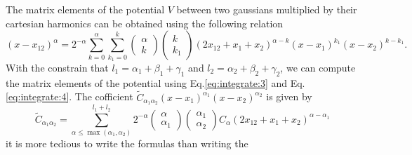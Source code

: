 \documentclass[prb]{revtex4}
\begin{document}
The matrix elements of the potential $V$ between two gaussians multiplied by
their cartesian harmonics can be obtained using the following relation
\begin{equation}
  \label{eq:integrate:6}
  (x-x_{12})^\alpha = 2 ^{-\alpha}\sum_{k=0}^\alpha\sum_{k_1=0}^k\left(
  \begin{array}{c}
    \alpha \\
    k
  \end{array}
  \right)
  \left(
  \begin{array}{c}
    k \\
    k_1
  \end{array}
  \right)
  (2 x_{12} + x_1 + x_2)^{\alpha-k}(x-x_1)^{k_1}(x-x_2)^{k-k_1}.
\end{equation}
With the constrain that $l_1 =\alpha_1+\beta_1+\gamma_1$ and $l_2
=\alpha_2+\beta_2+\gamma_2$, we can compute the matrix elements of the potential
using Eq.\ref{eq:integrate:3} and Eq.\ref{eq:integrate:4}. The cofficient
${\tilde C}_{\alpha_1\alpha_2} (x-x_1)^{\alpha_1} (x-x_2)^{\alpha_2}$ is given
by
\begin{equation}
  {\tilde C}_{\alpha_1\alpha_2}=\sum_{\alpha \leq \max(\alpha_1,\alpha_2)}^{l_1+l_2}2^{-\alpha}
  \left(
  \begin{array}{c}
    \alpha \\
    \alpha_1
  \end{array}\right)\left(
  \begin{array}{c}
    \alpha_1 \\
    \alpha_2
  \end{array}
  \right) C_{\alpha} (2 x_{12} + x_1 + x_2)^{\alpha-\alpha_1}
\end{equation}
it is more tedious to write the formulas than writing the
\end{document}

